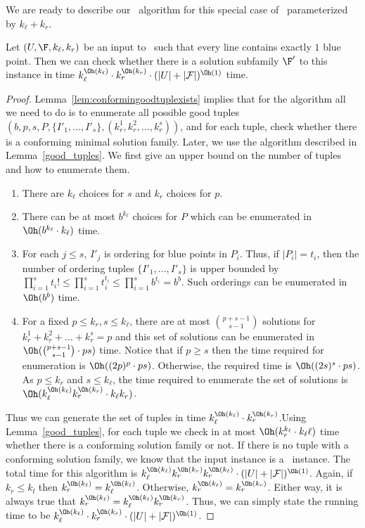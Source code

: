 We are ready to describe our \FPT\ algorithm for this special case of \slrbsc\ parameterized by $k_\ell+k_r$.
\begin{lem}\label{solution_1blue}
Let  $(U,\F , k_\ell ,k_r)$ be an input to  \slrbsc\ such that every line contains exactly $1$ blue point. Then we can check whether there is a solution subfamily $\F'$ to this instance in time 
$k_\ell^{\Oh(k_\ell)}\cdot k_r^{\Oh(k_r)}\cdot (\vert U \vert+ \vert {\cal F}\vert)^{\Oh(1)}$ time.
\end{lem}
\begin{proof}
Lemma~\ref{lem:conformingoodtuplexists} implies that for the algorithm all we need to do is to enumerate all possible good tuples 
$(b,p,s, P,   \{I'_1,\ldots,I'_s\}, (k_r^1,k_r^2,\ldots, k_r^s))$, and for each tuple, check whether there 
is a conforming minimal solution family. Later, we use the algorithm described in Lemma~\ref{good_tuples}. 
We first give an upper bound on the number of tuples  and how to enumerate them. 
\begin{enumerate}
\item There are $k_\ell$ choices for $s$ and $k_r$ choices for $p$.
\item There can be at most $b^{k_\ell}$ choices for $P$ which can be enumerated in  $\Oh(b^{k_\ell}\cdot k_\ell)$ time. 
\item For each $j\leq s$, $I'_j$ is ordering for blue points in $P_i$. Thus, if $|P_i|=t_i$, then the number of  ordering 
tuples $\{I'_1,\ldots,I'_s\}$ is upper bounded by $\prod_{i=1}^s t_i! \leq \prod_{i=1}^s t_i^{t_i} \leq  \prod_{i=1}^s b^{t_i} =b^b$. 
Such orderings can be enumerated in $\Oh(b^b)$ time.
 
\item For a fixed $p\leq k_r,s\leq k_\ell$, there are 
at most $p + s-1 \choose s -1$ solutions for $k_r^1+k_r^2+ \ldots + k_r^s = p$  
and this set of solutions can be enumerated in $\Oh({{p+s-1} \choose {s-1}}\cdot ps)$ time. Notice that if $p \geq s$ then the time required for enumeration is $\Oh((2p)^{p}\cdot ps)$. Otherwise, the required time is $\Oh((2s)^{s}\cdot ps)$. As $p \leq k_r$ and $s \leq k_\ell$, the time required to enumerate the set of solutions is $\Oh(k_\ell^{\Oh(k_\ell)}k_r^{\Oh(k_r)}\cdot k_\ell k_r)$. 
\end{enumerate}
   Thus we can generate the set of tuples in time $k_\ell^{\Oh(k_\ell)}\cdot k_r^{\Oh(k_r)}$.Using Lemma~\ref{good_tuples}, for each tuple we check in at most $\Oh(k_r^{k_\ell}\cdot k_\ell \ell)$ time whether there is a conforming solution family or not. If there is no tuple with a conforming solution family, we know that the input instance is a \NO\ instance. 
   The total time for this algorithm is $k_\ell^{\Oh(k_\ell)}k_r^{\Oh(k_r)}k_r^{\Oh(k_\ell)}\cdot (\vert U \vert+\vert {\cal F} \vert)^{\Oh(1)}$. Again, if $k_r \leq k_l$ then $k_r^{\Oh(k_\ell)} = k_\ell^{\Oh(k_\ell)}$. Otherwise, $k_r^{\Oh(k_\ell)} = k_r^{\Oh(k_r)}$. Either way, it is always true that $k_r^{\Oh(k_\ell)} = k_\ell^{\Oh(k_\ell)}k_r^{\Oh(k_r)}$. Thus, we can simply state the running time to be 
   $k_\ell^{\Oh(k_\ell)}\cdot k_r^{\Oh(k_r)}\cdot (\vert U \vert + \vert {\cal F}\vert)^{\Oh(1)}$.  
\end{proof}
